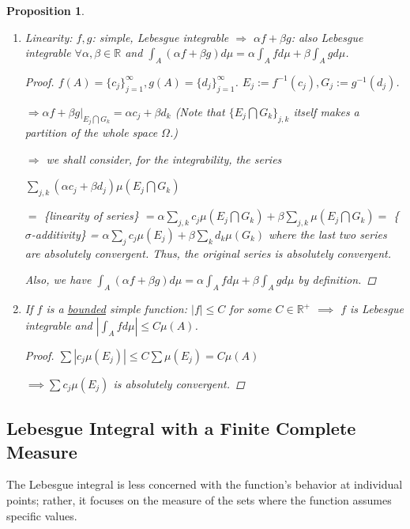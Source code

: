\documentclass[12pt]{article}
\theoremstyle{blueplain}
\newtheorem{proposition}[theorem]{Proposition}
\theoremstyle{bluedef}
\theoremstyle{blueremark}
\newcommand{\R}{\mathbb{R}}
\numberwithin{equation}{section}
\begin{document}
\begin{proposition}
  \begin{enumerate}
    \item Linearity: $f,g$: simple, Lebesgue integrable $\Rightarrow$ $\alpha f + \beta g$: also Lebesgue integrable $\forall \alpha, \beta \in \R$ and $\int_A (\alpha f + \beta g) d\mu = \alpha \int_A f d\mu + \beta \int_A g d\mu$.
          \begin{proof}
            $f(A) = \{c_j\}_{j=1}^{\infty}, g(A) = \{d_j\}_{j=1}^{\infty}$. $E_j := f^{-1}(c_j), G_j:= g^{-1}(d_j)$.

            $\Rightarrow \alpha f + \beta g |_{E_j \bigcap G_k} = \alpha c_j + \beta d_k$ (Note that $\{E_j \bigcap G_k\}_{j,k}$ itself makes a partition of the whole space $\Omega$.)

            $\Rightarrow$ we shall consider, for the integrability, the series

            $\sum_{j,k}(\alpha c_j + \beta d_j) \mu(E_j \bigcap G_k)$

            $=$ \{linearity of series\} $= \alpha \sum_{j,k} c_j \mu(E_j \bigcap G_k) + \beta \sum_{j,k} \mu(E_j \bigcap G_k)= $ \{$\sigma$-additivity\} = $\alpha \sum_{j} c_j \mu(E_j) + \beta \sum_{k} d_k \mu(G_k)$ where the last two series are absolutely convergent. Thus, the original series is absolutely convergent.

            Also, we have $\int_A (\alpha f + \beta g) d\mu = \alpha \int_A f d\mu + \beta \int_A g d\mu$ by definition.
          \end{proof}
    \item If $f$ is a \underline{bounded} simple function: $|f| \leq C$ for some $C \in \R^+$ $\implies$ $f$ is Lebesgue integrable and $|\int_A f d\mu| \leq C \mu(A)$.
          \begin{proof}
            $\sum |c_j \mu(E_j)| \leq C \sum \mu(E_j) = C \mu(A)$

            $\implies \sum c_j \mu(E_j)$ is absolutely convergent.
          \end{proof}
  \end{enumerate}
\end{proposition}

\clearpage

\subsection{Lebesgue Integral with a Finite Complete Measure}

The Lebesgue integral is less concerned with the function's behavior at individual points; rather, it focuses on the measure of the sets where the function assumes specific values.
\end{document}
